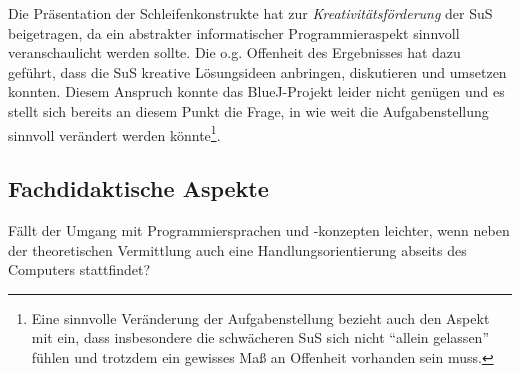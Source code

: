 \documentclass[paper=a4, DIV=13, BCOR=12mm, twoside=on, onecolumn=on, open = any, titlepage =on, parskip =half-, headsepline = on, footsepline = on, chapterprefix = on, sectionprefix = on, appendixprefix = off, fontsize = 11pt, numbers = noenddot, abstract = off]{scrreprt}
\begin{document}
Die Präsentation der Schleifenkonstrukte hat zur \emph{Kreativitätsförderung} der SuS beigetragen, da ein abstrakter informatischer Programmieraspekt sinnvoll veranschaulicht werden sollte. Die o.g. Offenheit des Ergebnisses hat dazu geführt, dass die SuS kreative Lösungsideen anbringen, diskutieren und umsetzen konnten. Diesem Anspruch konnte das BlueJ-Projekt leider nicht genügen und es stellt sich bereits an diesem Punkt die Frage, in wie weit die Aufgabenstellung sinnvoll verändert werden könnte\footnote{Eine sinnvolle Veränderung der Aufgabenstellung bezieht auch den Aspekt mit ein, dass insbesondere die schwächeren SuS sich nicht "`allein gelassen"' fühlen und trotzdem ein gewisses Maß an Offenheit vorhanden sein muss.}.
%



\par \singlespacing
\subsection*{Fachdidaktische Aspekte}
\onehalfspacing

Fällt der Umgang mit Programmiersprachen und -konzepten leichter, wenn neben der theoretischen Vermittlung auch eine Handlungsorientierung abseits des Computers stattfindet?
\end{document}
